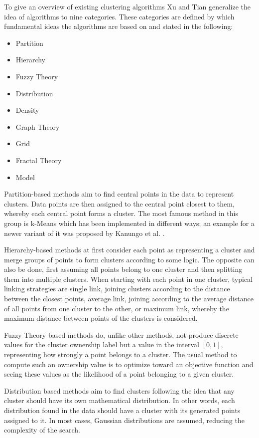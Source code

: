 \documentclass[
	a4paper,
	english,
	twoside,
	openright,               
	11pt                            
	]{report}
\begin{document}
To give an overview of existing clustering algorithms Xu and Tian \cite{surveyclustering} generalize the idea of algorithms to nine categories. These categories are defined by which fundamental ideas the algorithms are based on and stated in the following:
\begin{itemize}
  \item Partition
  \item Hierarchy
  \item Fuzzy Theory
  \item Distribution
  \item Density
  \item Graph Theory
  \item Grid
  \item Fractal Theory
  \item Model
\end{itemize}

Partition-based methods aim to find central points in the data to represent clusters. Data points are then assigned to the central point closest to them, whereby each central point forms a cluster. The most famous method in this group is k-Means which has been implemented in different ways; an example for a newer variant of it was proposed by Kanungo et al. \cite{1017616}.

Hierarchy-based methods at first consider each point as representing a cluster and merge groups of points to form clusters according to some logic. The opposite can also be done, first assuming all points belong to one cluster and then splitting them into multiple clusters. When starting with each point in one cluster, typical linking strategies are single link, joining clusters according to the distance between the closest points, average link, joining according to the average distance of all points from one cluster to the other, or maximum link, whereby the maximum distance between points of the clusters is considered.

Fuzzy Theory based methods do, unlike other methods, not produce discrete values for the cluster ownership label but a value in the interval $[0,1]$, representing how strongly a point belongs to a cluster. The usual method to compute such an ownership value is to optimize toward an objective function and seeing these values as the likelihood of a point belonging to a given cluster.

Distribution based methods aim to find clusters following the idea that any cluster should have its own mathematical distribution. In other words, each distribution found in the data should have a cluster with its generated points assigned to it. In most cases, Gaussian distributions are assumed, reducing the complexity of the search.
\end{document}
